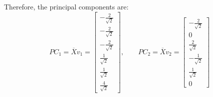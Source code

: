 \documentclass[12pt,a4paper]{article}
\begin{document}
Therefore, the principal components are:
$$
PC_1 = \overline{X}v_1 = \begin{bmatrix}
-\frac{2}{\sqrt{2}} \\
-\frac{2}{\sqrt{2}} \\
-\frac{2}{\sqrt{2}} \\
\frac{1}{\sqrt{2}} \\
\frac{1}{\sqrt{2}} \\
\frac{4}{\sqrt{2}}
\end{bmatrix}, 
\qquad
PC_2 = \overline{X}v_2 = \begin{bmatrix}
-\frac{2}{\sqrt{2}} \\
0 \\
\frac{2}{\sqrt{2}} \\
-\frac{1}{\sqrt{2}} \\
\frac{1}{\sqrt{2}} \\
0
\end{bmatrix}
$$
\end{document}

